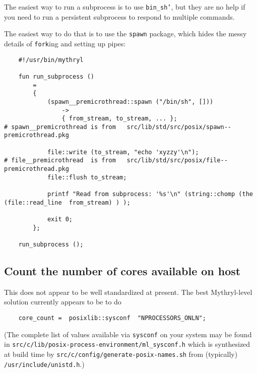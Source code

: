 The easiest way to run a subprocess is to use 
{\tt bin_sh'}, but they are no help if you need to 
run a persistent subprocess to respond to multiple commands.

The easiest way to do that is to use the {\tt spawn} package, 
which hides the messy details of {\tt fork}ing and setting 
up pipes:
\begin{verbatim}
    #!/usr/bin/mythryl

    fun run_subprocess ()
        = 
        {
            (spawn__premicrothread::spawn ("/bin/sh", []))
                ->
                { from_stream, to_stream, ... };                                        # spawn__premicrothread is from   src/lib/std/src/posix/spawn--premicrothread.pkg

            file::write (to_stream, "echo 'xyzzy'\n");                                  # file__premicrothread  is from   src/lib/std/src/posix/file--premicrothread.pkg
            file::flush to_stream;

            printf "Read from subprocess: '%s'\n" (string::chomp (the (file::read_line  from_stream) ) );

            exit 0;
        };

    run_subprocess ();

\end{verbatim}
\cutend*


\subsection{Count the number of cores available on host}

This does not appear to be well standardized at present. 
The best Mythryl-level solution currently appears to be to do 

\begin{verbatim}
    core_count =  posixlib::sysconf  "NPROCESSORS_ONLN";
\end{verbatim}

(The complete list of values available via {\tt sysconf} on your system may be 
found in {\tt src/c/lib/posix-process-environment/ml\_sysconf.h} 
which is synthesized at build time by {\tt src/c/config/generate-posix-names.sh} 
from (typically) {\tt /usr/include/unistd.h}.)

\cutend*


